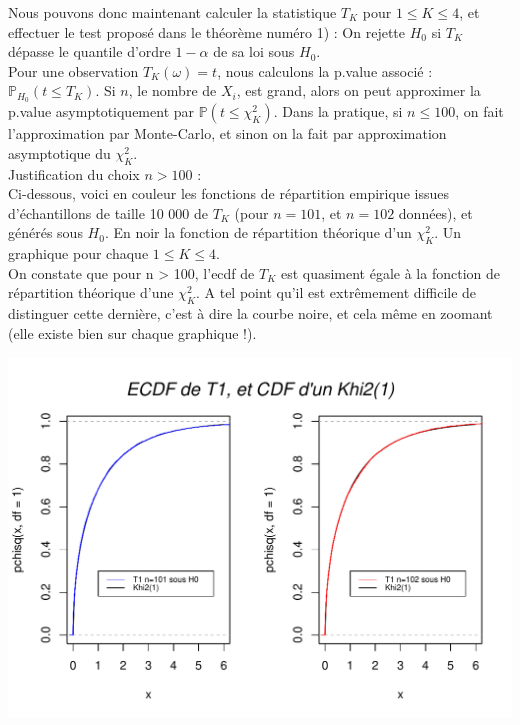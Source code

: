 \documentclass[12pt,a4paper]{article}
\begin{document}
Nous pouvons donc maintenant calculer la statistique $T_{K}$ pour $1 \leq K \leq 4$, et effectuer le test proposé dans le théorème numéro 1) : On rejette $H_{0}$ si $T_{K}$ dépasse le quantile d'ordre $1- \alpha$ de sa loi sous $H_{0}$. \\
Pour une observation $T_{K}(\omega)=t$, nous calculons la p.value associé : $\mathbb{P}_{H_{0}}(t \leq T_{K})$. Si $n$, le nombre de $X_{i}$, est grand, alors on peut approximer la p.value asymptotiquement par $\mathbb{P}(t \leq \chi^{2}_{K})$. Dans la pratique, si $n \leq 100$, on fait l'approximation par Monte-Carlo, et sinon on la fait par approximation asymptotique du $\chi^{2}_{K}$. \\

Justification du choix $n > 100$ : \\

Ci-dessous, voici en couleur les fonctions de répartition empirique issues d'échantillons de taille 10 000 de $T_{K}$ (pour $n=101$, et $n=102$ données), et générés sous $H_{0}$. En noir la fonction de répartition théorique d'un $\chi^{2}_{K}$. Un graphique pour chaque $1 \leq K \leq 4$. \\

On constate que pour n > 100, l'ecdf de $T_{K}$ est quasiment égale à la fonction de répartition théorique d'une $\chi^{2}_{K}$. A tel point qu'il est extrêmement difficile de distinguer cette dernière, c'est à dire la courbe noire, et cela même en zoomant (elle existe bien sur chaque graphique !).


\begin{center}
\includegraphics[scale=0.9]{ECDF1.pdf}
\end{center}
\end{document}
